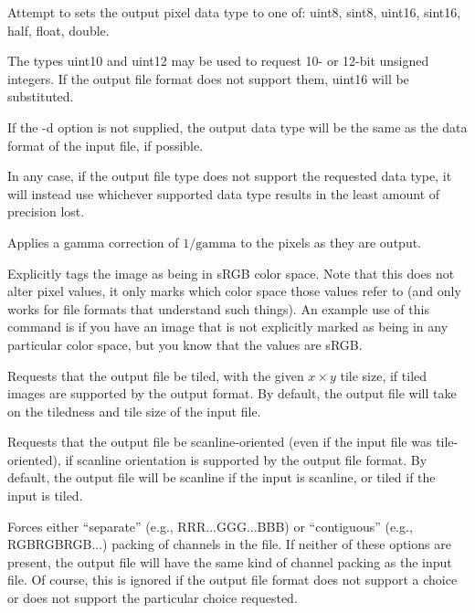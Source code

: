 Attempt to sets the output pixel data type to one of: {\cf uint8}, 
{\cf sint8}, {\cf uint16}, {\cf sint16}, {\cf half}, {\cf float}, 
{\cf double}.

The types {\cf uint10} and {\cf uint12} may be used to request 10- or
12-bit unsigned integers.  If the output file format does not support
them, {\cf uint16} will be substituted.

If the {\cf -d} option is not supplied, the output data type will
be the same as the data format of the input file, if possible.

In any case, if the output file type does not support the requested
data type, it will instead use whichever supported data type results
in the least amount of precision lost.

\apiend

Applies a gamma correction of $1/\mathrm{gamma}$ to the pixels as they
are output.
\apiend

Explicitly tags the image as being in sRGB color space.  Note that this
does not alter pixel values, it only marks which color space those
values refer to (and only works for file formats that understand such
things).  An example use of this command is if you have an image 
that is not explicitly marked as being in any particular color space,
but you know that the values are sRGB.
\apiend

Requests that the output file be tiled, with the given $x \times y$ 
tile size, if tiled images are supported by the output format.
By default, the output file will take on the tiledness and tile size
of the input file.
\apiend

Requests that the output file be scanline-oriented (even if the input
file was tile-oriented), if scanline orientation is supported by the
output file format.  By default, the output file will be scanline
if the input is scanline, or tiled if the input is tiled.
\apiend

Forces either ``separate'' (e.g., RRR...GGG...BBB) or ``contiguous''
(e.g., RGBRGBRGB...) packing of channels in the file.  If neither
of these options are present, the output file will have the same
kind of channel packing as the input file.  Of course, this is ignored
if the output file format does not support a choice or does not support
the particular choice requested.
\apiend

